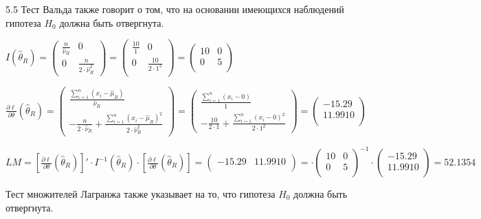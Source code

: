\begin{solution}{{5.5}}
Тест Вальда также говорит о том, что на основании имеющихся наблюдений гипотеза $H_0$ должна быть отвергнута.

$I(\hat{\theta}_{R}) = \begin{pmatrix}
\frac{n}{\hat{\nu}_{R}} & 0 \\
0 & \frac{n}{2 \cdot \hat{\nu}_{R}^2}
\end{pmatrix} = \begin{pmatrix}
\frac{10}{1} & 0 \\
0 & \frac{10}{2\cdot 1^2} \\
\end{pmatrix} = \begin{pmatrix}
10 & 0\\
0 & 5 \\
\end{pmatrix}$

$\frac{\partial \ell}{\partial \theta}(\hat{\theta}_{R}) = \begin{pmatrix}
\frac{\sum_{i=1}^n (x_i - \hat{\mu}_R)}{\hat{\nu}_R}\\
-\frac{n}{2\cdot \hat{\nu}_R} + \frac{\sum_{i=1}^n (x_i - \hat{\mu}_R)^2}{2 \cdot \hat{\nu}_R^2}
\end{pmatrix} = \begin{pmatrix}
\frac{\sum_{i=1}^n (x_i - 0)}{1}\\
-\frac{10}{2\cdot 1} + \frac{\sum_{i=1}^n (x_i - 0)^2}{2 \cdot 1^2}
\end{pmatrix} = \begin{pmatrix}
-15.29 \\
11.9910\\
\end{pmatrix}$

$LM = \left[ \frac{\partial \ell}{\partial \theta}(\hat{\theta}_{R}) \right]' \cdot I^{-1}(\hat{\theta}_{R}) \cdot \left[ \frac{\partial \ell}{\partial \theta}(\hat{\theta}_{R}) \right] = \begin{pmatrix}
-15.29 & 11.9910 \\
\end{pmatrix} = \cdot \begin{pmatrix}
10 & 0\\
0 & 5 \\
\end{pmatrix}^{-1} \cdot \begin{pmatrix}
-15.29 \\
11.9910\\
\end{pmatrix} = 52.1354$

Тест множителей Лагранжа также указывает на то, что гипотеза $H_0$ должна быть отвергнута.
\end{solution}
